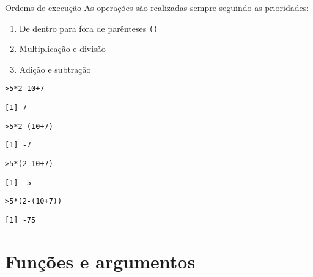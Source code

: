\documentclass[10pt,handout]{beamer}\usepackage{graphicx, color}
\makeatletter
\newenvironment{kframe}{%
 \def\at@end@of@kframe{}%
 \ifinner\ifhmode%
  \def\at@end@of@kframe{\end{minipage}}%
  \begin{minipage}{\columnwidth}%
 \fi\fi%
 \def\FrameCommand##1{\hskip\@totalleftmargin \hskip-\fboxsep
 \colorbox{shadecolor}{##1}\hskip-\fboxsep
     \hskip-\linewidth \hskip-\@totalleftmargin \hskip\columnwidth}%
 \MakeFramed {\advance\hsize-\width
   \@totalleftmargin\z@ \linewidth\hsize
   \@setminipage}}%
 {\par\unskip\endMakeFramed%
 \at@end@of@kframe}
\newenvironment{knitrout}{}{} %
\makeatother
\begin{document}
\begin{frame}[fragile=singleslide]{Ordems de execução}
As operações são realizadas sempre seguindo as prioridades:
\begin{enumerate}
\item De dentro para fora de parênteses \verb|()|
\item Multiplicação e divisão
\item Adição e subtração
\end{enumerate}
\begin{knitrout}\small
{}\color{fgcolor}\begin{kframe}
\begin{alltt}
> 5 * 2 - 10 + 7
\end{alltt}
\begin{verbatim}
[1] 7
\end{verbatim}
\begin{alltt}
> 5 * 2 - (10 + 7)
\end{alltt}
\begin{verbatim}
[1] -7
\end{verbatim}
\begin{alltt}
> 5 * (2 - 10 + 7)
\end{alltt}
\begin{verbatim}
[1] -5
\end{verbatim}
\begin{alltt}
> 5 * (2 - (10 + 7))
\end{alltt}
\begin{verbatim}
[1] -75
\end{verbatim}
\end{kframe}
\end{knitrout}

\end{frame}

\section{Funções e argumentos}
\end{document}

